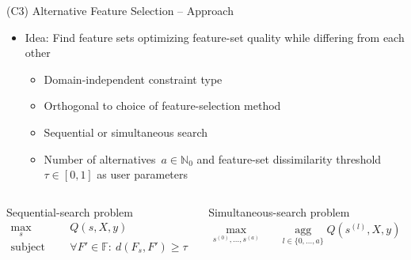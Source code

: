 \documentclass[en, navbarinline, handout]{sdqbeamer}
\begin{document}
\begin{frame}[t]{(C3) Alternative Feature Selection -- Approach}
	\begin{itemize}
		\item Idea: Find feature sets optimizing feature-set quality while differing from each other
		\begin{itemize}
			\item Domain-independent constraint type
			\item Orthogonal to choice of feature-selection method
			\item Sequential or simultaneous search
			\item Number of alternatives~$a \in \mathbb{N}_0$ and feature-set dissimilarity threshold $\tau \in [0,1]$ as user parameters
		\end{itemize}
	\end{itemize}
	\pause
	\begin{columns}
		\begin{greenblock}{Sequential-search problem}
			\vspace{-\baselineskip}
			\begin{equation*}
				\begin{aligned}
					\max_s &\quad Q(s,X,y) \\
					\text{subject to:} &\quad \forall F' \in \mathbb{F}:~d(F_s,F') \geq \tau
				\end{aligned}
				\label{eq:afs:afs-sequential}
			\end{equation*}
		\end{greenblock}
		\begin{greenblock}{Simultaneous-search problem}
			\vspace{-\baselineskip}
			\begin{equation*}
				\begin{aligned}
					\max_{s^{(0)}, \dots, s^{(a)}} &\quad \operatorname*{agg}_{l \in \{0, \dots, a\}} Q(s^{(l)},X,y) \\

\end{aligned}
\end{equation*}
\end{greenblock}
\end{columns}
\end{frame}
\end{document}
